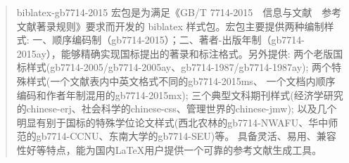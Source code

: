 \documentclass[11pt]{article} %
\begin{document}



\pagestyle{plain}



\dateformanual{\today}

\titleandauthor

\begin{quotation}
biblatex-gb7714-2015 宏包是为满足《GB/T 7714-2015~~信息与文献~~参考文献著录规则》要求而开发的 biblatex 样式包。宏包主要提供两种编制样式: 一、顺序编码制（gb7714-2015）；二、著者-出版年制（gb7714-2015ay），能够精确实现国标提出的著录和标注格式。另外提供: 两个老版国标样式(gb7714-2005/gb7714-2005ay、gb7714-1987/gb7714-1987ay); 两个特殊样式(一个文献表内中英文格式不同的gb7714-2015ms、 一个文档内顺序编码和作者年制混用的gb7714-2015mx); 三个典型文科期刊样式(经济学研究的chinese-erj、社会科学的chinese-css、管理世界的chinese-jmw);  以及几个明显有别于国标的特殊学位论文样式(西北农林的gb7714-NWAFU、华中师范的gb7714-CCNU、东南大学的gb7714-SEU)等。
具备灵活、易用、兼容性好等特点，能为国内\LaTeX{}用户提供一个可靠的参考文献生成工具。
\end{quotation}
\tableofcontents

\listoffigures
\listoftables
\listofegcode
\newlength{\textparwd}
\end{document}
